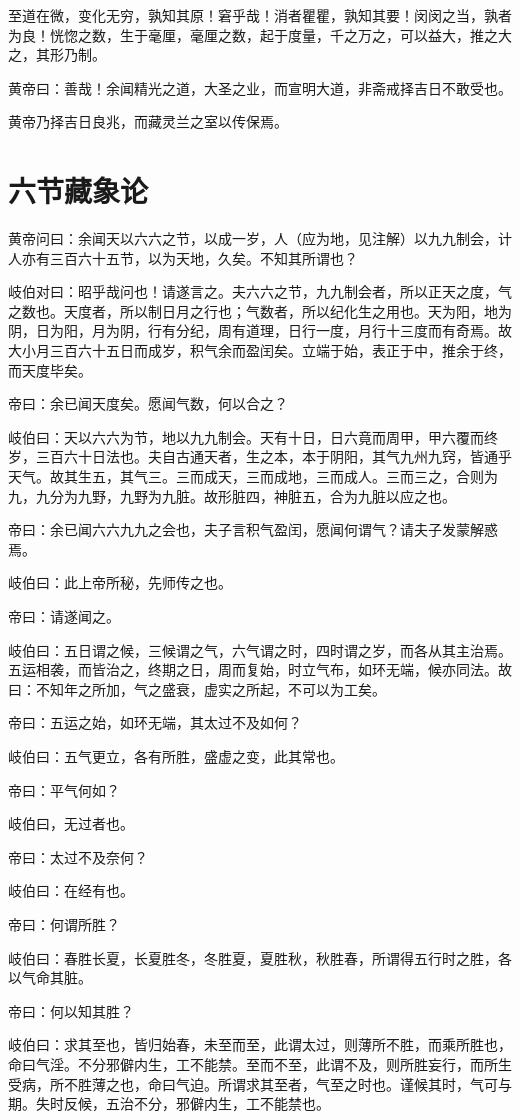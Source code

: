 \documentclass{article}%
\begin{document}
至道在微，变化无穷，孰知其原！窘乎哉！消者瞿瞿，孰知其要！闵闵之当，孰者为良！恍惚之数，生于毫厘，毫厘之数，起于度量，千之万之，可以益大，推之大之，其形乃制。

黄帝曰：善哉！余闻精光之道，大圣之业，而宣明大道，非斋戒择吉日不敢受也。

黄帝乃择吉日良兆，而藏灵兰之室以传保焉。
\section{六节藏象论}
黄帝问曰：余闻天以六六之节，以成一岁，人（应为地，见注解）以九九制会，计人亦有三百六十五节，以为天地，久矣。不知其所谓也？

岐伯对曰：昭乎哉问也！请遂言之。夫六六之节，九九制会者，所以正天之度，气之数也。天度者，所以制日月之行也；气数者，所以纪化生之用也。天为阳，地为阴，日为阳，月为阴，行有分纪，周有道理，日行一度，月行十三度而有奇焉。故大小月三百六十五日而成岁，积气余而盈闰矣。立端于始，表正于中，推余于终，而天度毕矣。

帝曰：余已闻天度矣。愿闻气数，何以合之？

岐伯曰：天以六六为节，地以九九制会。天有十日，日六竟而周甲，甲六覆而终岁，三百六十日法也。夫自古通天者，生之本，本于阴阳，其气九州九窍，皆通乎天气。故其生五，其气三。三而成天，三而成地，三而成人。三而三之，合则为九，九分为九野，九野为九脏。故形脏四，神脏五，合为九脏以应之也。

帝曰：余已闻六六九九之会也，夫子言积气盈闰，愿闻何谓气？请夫子发蒙解惑焉。

岐伯曰：此上帝所秘，先师传之也。

帝曰：请遂闻之。

岐伯曰：五日谓之候，三候谓之气，六气谓之时，四时谓之岁，而各从其主治焉。五运相袭，而皆治之，终期之日，周而复始，时立气布，如环无端，候亦同法。故曰：不知年之所加，气之盛衰，虚实之所起，不可以为工矣。

帝曰：五运之始，如环无端，其太过不及如何？

岐伯曰：五气更立，各有所胜，盛虚之变，此其常也。

帝曰：平气何如？

岐伯曰，无过者也。

帝曰：太过不及奈何？

岐伯曰：在经有也。

帝曰：何谓所胜？

岐伯曰：春胜长夏，长夏胜冬，冬胜夏，夏胜秋，秋胜春，所谓得五行时之胜，各以气命其脏。

帝曰：何以知其胜？

岐伯曰：求其至也，皆归始春，未至而至，此谓太过，则薄所不胜，而乘所胜也，命曰气淫。不分邪僻内生，工不能禁。至而不至，此谓不及，则所胜妄行，而所生受病，所不胜薄之也，命曰气迫。所谓求其至者，气至之时也。谨候其时，气可与期。失时反候，五治不分，邪僻内生，工不能禁也。
\end{document}
